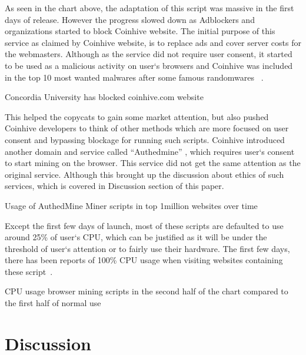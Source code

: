 As seen in the chart above, the adaptation of this script was massive in the first days of release. However the progress slowed down as Adblockers and organizations started to block Coinhive website. The initial purpose of this service as claimed by Coinhive website, is to replace ads and cover server costs for the webmasters. Although as the service did not require user consent, it started to be used as a malicious activity on user`s browsers and Coinhive was included in the top 10 most wanted malwares after some famous randomwares ~\cite{checkpoint}. 

\begin{center}
	\caption{Concordia University has blocked coinhive.com website}
\end{center}

This helped the copycats to gain some market attention, but also pushed Coinhive developers to think of other methods which are more focused on user consent and bypassing blockage for running such scripts. Coinhive introduced another domain and service called ``Authedmine'' , which requires user`s consent to start mining on the browser. This service did not get the same attention as the original service. Although this brought up the discussion about ethics of such services, which is covered in Discussion section of this paper. 

\begin{center}
	\caption{Usage of AuthedMine Miner scripts in top 1million websites over time}
\end{center}

Except the first few days of launch, most of these scripts are defaulted to use around 25\% of user`s CPU, which can be justified as it will be under the threshold of user`s attention or to fairly use their hardware. The first few days, there has been reports of 100\% CPU usage when visiting websites containing these script~\cite{piratesbayblog}.

\begin{center}
	\caption{CPU usage browser mining scripts in the second half of the chart compared to the first half of normal use}
\end{center}

\section{Discussion}

